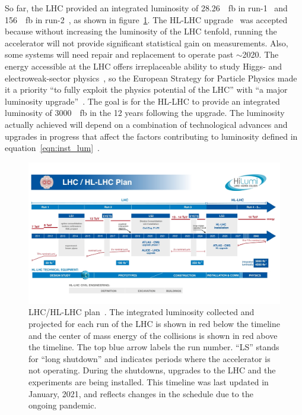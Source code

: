 So far, the LHC provided an integrated luminosity of \SI{28.26}{\per\femto\barn} in run-1~\cite{atlas_luminosity_run1} and \SI{156}{\per\femto\barn} in run-2~\cite{atlas_luminosity_run2}, as shown in figure~\ref{fig:hl-lhc}. The HL-LHC upgrade~\cite{hl_lhc_tdr} was accepted because without increasing the luminosity of the LHC tenfold, running the accelerator will not provide significant statistical gain on measurements. Also, some systems will need repair and replacement to operate past $\sim$2020. The energy accessible at the LHC offers irreplaceable ability to study Higgs- and electroweak-sector physics~\cite{dainese_physics_2018}, so the European Strategy for Particle Physics made it a priority ``to fully exploit the physics potential of the LHC'' with ``a major luminosity upgrade''~\cite{european_strategy_for_particle_physics}. The goal is for the HL-LHC to provide an integrated luminosity of \SI{3000}{\per\femto\barn} in the 12 years following the upgrade. The luminosity actually achieved will depend on a combination of technological advances and upgrades in progress that affect the factors contributing to luminosity defined in equation~\ref{eqn:inst_lum}~\cite{hl_lhc_tdr}.


\begin{figure}
    \centering
    \includegraphics[width = \textwidth]{figures/HL-LHC-updated-January-2021_small.jpg}
    \caption{LHC/HL-LHC plan~\cite{hl-lhc_plan_picture_website}. The integrated luminosity collected and projected for each run of the LHC is shown in red below the timeline and the center of mass energy of the collisions is shown in red above the timeline. The top blue arrow labels the run number. ``LS'' stands for ``long shutdown'' and indicates periods where the accelerator is not operating. During the shutdowns, upgrades to the LHC and the experiments are being installed. This timeline was last updated in January, 2021, and reflects changes in the schedule due to the ongoing pandemic. }
    \label{fig:hl-lhc}
\end{figure}

